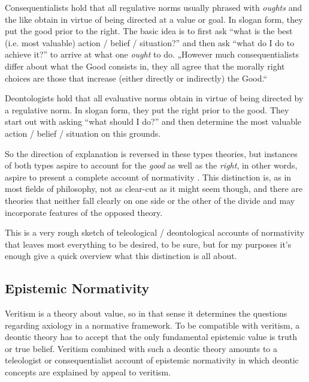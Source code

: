 \documentclass[12pt,numbers=noenddot]{scrartcl}
\begin{document}
Consequentialists hold that all regulative norms usually phrased with \emph{oughts} and the like obtain in virtue of being directed at a value or goal. In slogan form, they put the good prior to the right. The basic idea is to first ask “what is the best (i.e. most valuable) action / belief / situation?” and then ask “what do I do to achieve it?” to arrive at what one \emph{ought} to do. „However much consequentialists differ about what the Good consists in, they all agree that the morally right choices are those that increase (either directly or indirectly) the Good.“ \autocite{sep-ethics-deontological}

Deontologists hold that all evaluative norms obtain in virtue of being directed by a regulative norm. In slogan form, they put the right prior to the good. They start out with asking “what should I do?” and then determine the most valuable action / belief / situation on this grounds. 

So the direction of explanation is reversed in these types theories, but instances of both types aspire to account for the \emph{good} as well as the \emph{right}, in other words, aspire to present a complete account of normativity \parencite[341]{Berker2013-BERETA-2}. This distinction is, as in most fields of philosophy, not as clear-cut as it might seem though, and there are theories that neither fall clearly on one side or the other of the divide and may incorporate features of the opposed theory.

This is a very rough sketch of teleological / deontological accounts of normativity that leaves most everything to be desired, to be sure, but for my purposes it's enough give a quick overview what this distinction is all about.

\subsection{Epistemic Normativity} \label{subsec: epistemic}

Veritism is a theory about value, so in that sense it determines the questions regarding axiology in a normative framework. To be compatible with veritism, a deontic theory has to accept that the only fundamental epistemic value is truth or true belief. Veritism combined with such a deontic theory amounts to a teleologist or consequentialist account of epistemic normativity in which deontic concepts are explained by appeal to veritism.
\end{document}
